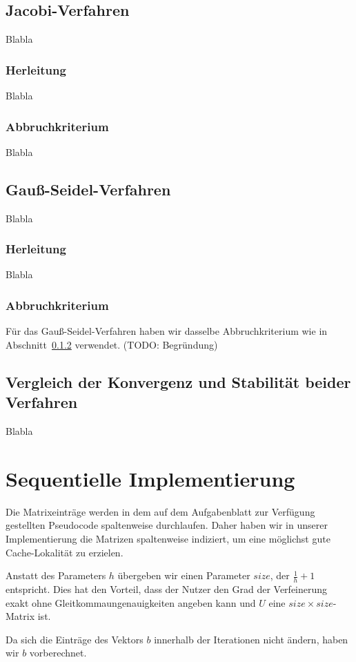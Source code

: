\documentclass{article}
\begin{document}
\subsection{Jacobi-Verfahren}
Blabla
\subsubsection{Herleitung}
Blabla
\subsubsection{Abbruchkriterium} \label{jacobi:abbruch}
Blabla

\subsection{Gauß-Seidel-Verfahren}
Blabla
\subsubsection{Herleitung}
Blabla
\subsubsection{Abbruchkriterium}
Für das Gauß-Seidel-Verfahren haben wir dasselbe Abbruchkriterium wie in Abschnitt~\ref{jacobi:abbruch} verwendet. (TODO: Begründung)

\subsection{Vergleich der Konvergenz und Stabilität beider Verfahren}\label{konvergenz}
Blabla

\section{Sequentielle Implementierung}

Die Matrixeinträge werden in dem auf dem Aufgabenblatt zur Verfügung gestellten Pseudocode spaltenweise durchlaufen. Daher haben wir in unserer Implementierung die Matrizen spaltenweise indiziert, um eine möglichst gute Cache-Lokalität zu erzielen.

Anstatt des Parameters $h$ übergeben wir einen Parameter $size$, der $\frac{1}{h}+1$ entspricht. Dies hat den Vorteil, dass der Nutzer den Grad der Verfeinerung exakt ohne Gleitkommaungenauigkeiten angeben kann und $U$ eine $size \times size$-Matrix ist.
 
Da sich die Einträge des Vektors $b$ innerhalb der Iterationen nicht ändern, haben wir $b$ vorberechnet.
\end{document}
